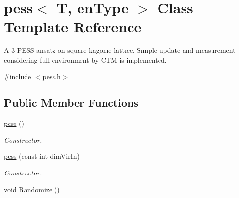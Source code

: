 \hypertarget{classpess}{}\section{pess$<$ T, en\+Type $>$ Class Template Reference}
\label{classpess}


A 3-\/\+P\+E\+SS ansatz on square kagome lattice. Simple update and measurement considering full environment by C\+TM is implemented.  




{\ttfamily \#include $<$pess.\+h$>$}

\subsection*{Public Member Functions}
\begin{DoxyCompactItemize}
\item 
\hyperlink{classpess_affe9cbee1e0d1536498ad766e8c44d87}{pess} ()\hypertarget{classpess_affe9cbee1e0d1536498ad766e8c44d87}{}\label{classpess_affe9cbee1e0d1536498ad766e8c44d87}

\begin{DoxyCompactList}\small\item\em Constructor. \end{DoxyCompactList}\item 
\hyperlink{classpess_a1701e98a18d01946f8af9a54fa9c5e7d}{pess} (const int dim\+Vir\+In)
\begin{DoxyCompactList}\small\item\em Constructor. \end{DoxyCompactList}\item 
void \hyperlink{classpess_a998e0185678e6d3a913962727c4a4365}{Randomize} ()\hypertarget{classpess_a998e0185678e6d3a913962727c4a4365}{}\label{classpess_a998e0185678e6d3a913962727c4a4365}


\end{DoxyCompactItemize}
